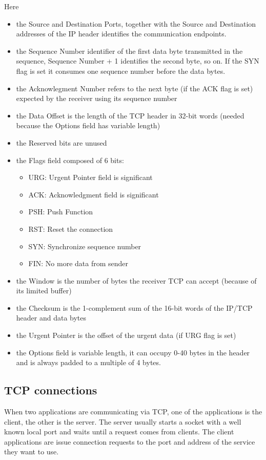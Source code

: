 Here
\begin{itemize}
  \item the Source and Destination Ports, together with the Source and Destination
  addresses of the IP header identifies the communication endpoints.
  \item the Sequence Number identifier of the first data byte transmitted in the sequence,
  Sequence Number + 1 identifies the second byte, so on. If the SYN flag is set it consumes
  one sequence number before the data bytes.
  \item the Acknowlegment Number refers to the next byte (if the ACK flag is set) expected
  by the receiver using its sequence number
  \item the Data Offset is the length of the TCP header in 32-bit words (needed because the
  Options field has variable length)
  \item the Reserved bits are unused
  \item the Flags field composed of 6 bits:
  \begin{itemize}
    \item URG: Urgent Pointer field is significant
    \item ACK: Acknowledgment field is significant
    \item PSH: Push Function
    \item RST: Reset the connection
    \item SYN: Synchronize sequence number
    \item FIN: No more data from sender
  \end{itemize}
  \item the Window is the number of bytes the receiver TCP can accept (because of its
  limited buffer)
  \item the Checksum is the 1-complement sum of the 16-bit words of the IP/TCP header and
  data bytes
  \item the Urgent Pointer is the offset of the urgent data (if URG flag is set)
  \item the Options field is variable length, it can occupy 0-40 bytes in the header and is
  always padded to a multiple of 4 bytes.
\end{itemize}

\subsection{TCP connections}

When two applications are communicating via TCP, one of the applications is the client,
the other is the server. The server usually starts a socket with a well known local port
and waits until a request comes from clients. The client applications are issue connection
requests to the port and address of the service they want to use.


